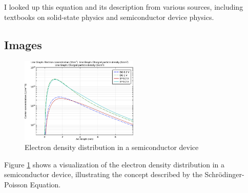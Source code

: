 \documentclass{article}
\begin{document}
I looked up this equation and its description from various sources, including textbooks on solid-state physics and semiconductor device physics.

\subsection{Images}

\begin{figure}
    \centering
    \includegraphics[width=0.5\textwidth]{image.png}
    \caption{Electron density distribution in a semiconductor device}
    \label{fig:image9}
\end{figure}

Figure \ref{fig:image9} shows a visualization of the electron density distribution in a semiconductor device, illustrating the concept described by the Schrödinger-Poisson Equation.






\end{document}
